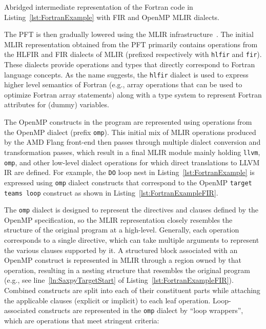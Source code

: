 \documentclass[acmtog,natbib=false]{acmart}
\newcommand{\code}[1]{\texttt{#1}\xspace}
\begin{document}
\begin{listing}[t]
\inputminted{MLIR-lexer.py:MlirLexer -x}{code/tgt_loop_abridged.fir}
\caption{Abridged intermediate representation of the Fortran code in Listing~\ref{lst:FortranExample} with \acs{FIR} and OpenMP \acs{MLIR} dialects.}
\label{lst:FortranExampleFIR}
\end{listing}


The \ac{PFT} is then gradually lowered using the \ac{MLIR} infrastructure~\cite{mlir}. The initial \ac{MLIR} representation obtained from the \ac{PFT} primarily contains operations from the \ac{HLFIR} and \ac{FIR} dialects of \ac{MLIR} (prefixed respectively with \code{hlfir} and \code{fir}).
These dialects provide operations and types that directly correspond to Fortran language concepts.
As the name suggests, the \code{hlfir} dialect is used to express higher level semantics of Fortran (e.g., array operations that can be used to optimize Fortran array statements) along with a type system to represent Fortran attributes for (dummy) variables.

The OpenMP constructs in the program are represented using operations from the OpenMP dialect (prefix \code{omp}).
This initial mix of \ac{MLIR} operations produced by the AMD Flang front-end then passes through multiple dialect conversion and transformation passes, which result in a final \ac{MLIR} module mainly holding \code{llvm}, \code{omp}, and other low-level dialect operations for which direct translations to LLVM \ac{IR} are defined.
For example, the \code{DO} loop nest in Listing~\ref{lst:FortranExample} is expressed using \code{omp} dialect constructs that correspond to the OpenMP \code{target teams loop} construct as shown in Listing~\ref{lst:FortranExampleFIR}.

The \code{omp} dialect is designed to represent the directives and clauses defined by the OpenMP specification, so the \ac{MLIR} representation closely resembles the structure of the original program at a high-level.
Generally, each operation corresponds to a single directive, which can take multiple arguments to represent the various clauses supported by it.
A structured block associated with an OpenMP construct is represented in \ac{MLIR} through a region owned by that operation, resulting in a nesting structure that resembles the original program (e.g., see line~\ref{ln:SaxpyTargetStart} of Listing~\ref{lst:FortranExampleFIR}).
Combined constructs are split into each of their constituent parts while attaching the applicable clauses (explicit or implicit) to each leaf operation.
Loop-associated constructs are represented in the \code{omp} dialect by ``loop wrappers'', which are operations that meet stringent criteria:
\end{document}
